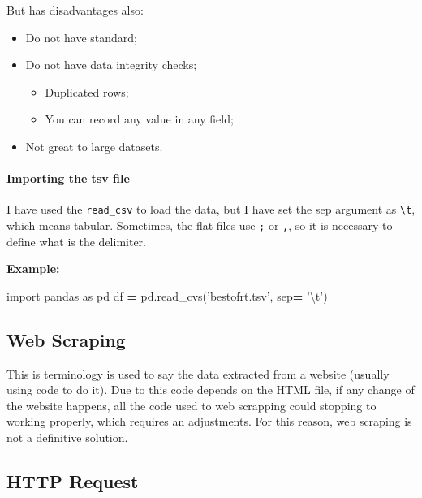 \documentclass[]{book}
\newenvironment{Shaded}{\begin{snugshade}}{\end{snugshade}}
\newcommand{\CharTok}[1]{\textcolor[rgb]{0.31,0.60,0.02}{#1}}
\newcommand{\StringTok}[1]{\textcolor[rgb]{0.31,0.60,0.02}{#1}}
\newcommand{\ImportTok}[1]{#1}
\newcommand{\OperatorTok}[1]{\textcolor[rgb]{0.81,0.36,0.00}{\textbf{#1}}}
\newcommand{\NormalTok}[1]{#1}
\providecommand{\tightlist}{%
  \setlength{\itemsep}{0pt}\setlength{\parskip}{0pt}}
\let\oldparagraph\paragraph
\renewcommand{\paragraph}[1]{\oldparagraph{#1}\mbox{}}
\begin{document}
But has disadvantages also:

\begin{itemize}
\tightlist
\item
  Do not have standard;
\item
  Do not have data integrity checks;

  \begin{itemize}
  \tightlist
  \item
    Duplicated rows;
  \item
    You can record any value in any field;
  \end{itemize}
\item
  Not great to large datasets.
\end{itemize}

\paragraph{Importing the tsv file}\label{importing-the-tsv-file}

I have used the \texttt{read\_csv} to load the data, but I have set the
sep argument as \texttt{\textbackslash{}t}, which means tabular.
Sometimes, the flat files use \texttt{;} or \texttt{,}, so it is
necessary to define what is the delimiter.

\textbf{Example:}

\begin{Shaded}
\begin{Highlighting}[]
\ImportTok{import}\NormalTok{ pandas }\ImportTok{as}\NormalTok{ pd}
\NormalTok{df }\OperatorTok{=}\NormalTok{ pd.read_cvs(}\StringTok{'bestofrt.tsv'}\NormalTok{, sep}\OperatorTok{=} \StringTok{'}\CharTok{\textbackslash{}t}\StringTok{'}\NormalTok{)}
\end{Highlighting}
\end{Shaded}

\subsection{Web Scraping}\label{web-scraping}

This is terminology is used to say the data extracted from a website
(usually using code to do it). Due to this code depends on the HTML
file, if any change of the website happens, all the code used to web
scrapping could stopping to working properly, which requires an
adjustments. For this reason, web scraping is not a definitive solution.

\subsection{HTTP Request}\label{http-request}
\end{document}
